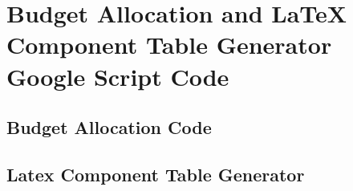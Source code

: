 \newpage
\section{Budget Allocation and LaTeX Component Table Generator Google Script Code} \label{sec:appK}
\subsection{Budget Allocation Code}



\newpage
\subsection{Latex Component Table Generator}



\newpage